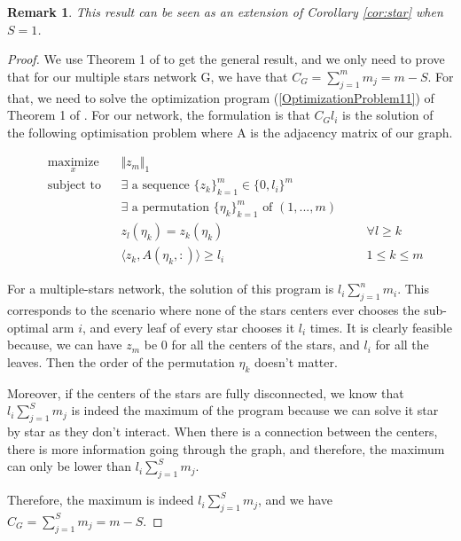 \documentclass{article}
\newtheorem{remark}{Remark}
\begin{document}
\begin{remark}
  This result can be seen as an extension of Corollary \ref{cor:star} when $S = 1$.
\end{remark}

\begin{proof}

We use Theorem 1 of \cite{DBLP:journals/corr/KollaJG16} to get the general result, and we only need to prove that for our multiple stars network G, we have that $C_G = \sum_{j=1}^m m_j = m - S$. For that, we need to solve the optimization program (\ref{OptimizationProblem11}) of Theorem 1 of \cite{DBLP:journals/corr/KollaJG16}. For our network, the formulation is that $C_Gl_i$ is the solution of the following optimisation problem where A is the adjacency matrix of our graph.

\begin{equation*}
\begin{aligned}
& \underset{x}{\text{maximize}}
&& \Vert z_m \Vert_1
&&& \\
& \text{subject to}
&& \exists\text{ a sequence }\{z_k\}_{k=1}^{m} \in \{0, l_i\}^{m}
&&& \\
&
&& \exists\text{ a permutation }\{\eta_k\}_{k=1}^{m} \text{ of } (1, ..., m)
&&& \\
&
&& z_l(\eta_k) = z_k(\eta_k)
&&& \forall l \geq k \\
&
&& \langle z_k, A(\eta_k, :)\rangle \geq l_i
&&& 1\leq k \leq m
\end{aligned}
\end{equation*}

For a multiple-stars network, the solution of this program is $l_i \sum_{j=1}^n m_i$. This corresponds to the scenario where none of the stars centers ever chooses the sub-optimal arm $i$, and every leaf of every star chooses it $l_i$ times. It is clearly feasible because, we can have $z_{m}$ be 0 for all the centers of the stars, and $l_i$ for all the leaves. Then the order of the permutation $\eta_k$ doesn't matter.

Moreover, if the centers of the stars are fully disconnected, we know that $l_i \sum_{j=1}^S m_j$ is indeed the maximum of the program because we can solve it star by star as they don't interact. When there is a connection between the centers, there is more information going through the graph, and therefore, the maximum can only be lower than $l_i \sum_{j=1}^S m_j$.

Therefore, the maximum is indeed $l_i \sum_{j=1}^S m_j$, and we have $C_G = \sum_{j=1}^S m_j = m - S$.

\end{proof}
\end{document}

